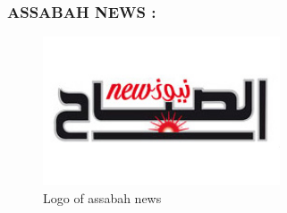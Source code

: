  \subsubsection{ASSABAH NEWS : }


\begin{figure}[H]
	\includegraphics[width=7cm]{assbah.jpg}
	\caption{Logo of assabah news }
	\label{imag3}
\end{figure}
